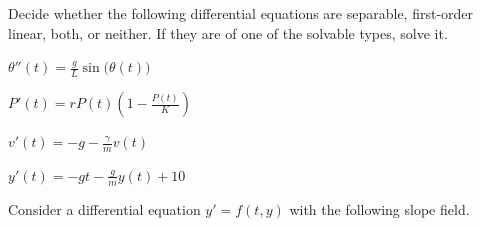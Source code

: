\begin{lesson}

%	
%
%	

\end{lesson}




\newpage

\question 
	Decide whether the following differential equations are separable, first-order linear, both, or neither. If they are of one of the solvable types, solve it.

\begin{parts}
	\item $\displaystyle\theta''(t) = \frac{g}{L} \sin\big(\theta(t)\big)$
	\item $\displaystyle P'(t) = r P(t) \left( 1 - \frac{P(t)}{K} \right)$
	\item $\displaystyle v'(t) = -g - \frac{\gamma}{m} v(t)$
	\item $\displaystyle y'(t) = -gt - \frac{g}{m} y(t) + 10$
\end{parts}











\bookonlynewpage


\question Consider a differential equation $y' = f(t,y)$ with the following slope field.

